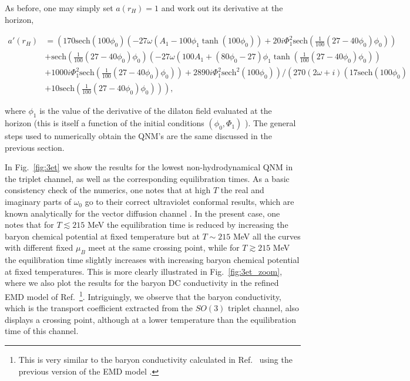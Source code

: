 \documentclass[aps,prd,showkeys,superscriptaddress,singlecolumn,nofootinbib,floatfix]{revtex4-1}
\begin{document}
As before, one may simply set $a(r_H)=1$ and work out its derivative at the horizon,
\begin{widetext}
\begin{align}
a'(r_H) &= \left( 170 \text{sech}\left(100 \phi _0\right) \left(-27 \omega  \left(A_1-100 \phi _1 \tanh \left(100 \phi _0\right)\right)+20 i \Phi _1^2 \text{sech}\left(\frac{1}{100}
   \left(27-40 \phi _0\right) \phi _0\right)\right)\right.\nonumber\\
&+\text{sech}\left(\frac{1}{100} \left(27-40 \phi _0\right) \phi _0\right) \left(-27 \omega  \left(100 A_1+\left(80 \phi
   _0-27\right) \phi _1 \tanh \left(\frac{1}{100} \left(27-40 \phi _0\right) \phi _0\right)\right)\right.\nonumber\\
&\left.\left. +1000 i \Phi _1^2 \text{sech}\left(\frac{1}{100} \left(27-40 \phi _0\right) \phi
   _0\right)\right)+2890 i \Phi _1^2 \text{sech}^2\left(100 \phi _0\right)\right) / \left(270 (2 \omega +i) \left(17 \text{sech}\left(100 \phi _0\right)\right.\right.\nonumber\\
&\left.\left.+10 \text{sech}\left(\frac{1}{100}
   \left(27-40 \phi _0\right) \phi _0\right)\right)\right),
\label{eq:a1num}
\end{align}
\end{widetext}
where $\phi_1$ is the value of the derivative of the dilaton field evaluated at the horizon (this is itself a function of the initial conditions $(\phi_0,\Phi_1)$ \cite{Critelli:2017oub}). The general steps used to numerically obtain the QNM's are the same discussed in the previous section.

In Fig.\ \ref{fig:3et} we show the results for the lowest non-hydrodynamical QNM in the triplet channel, as well as the corresponding equilibration times. As a basic consistency check of the numerics, one notes that at high $T$ the real and imaginary parts of $\omega_0$ go to their correct ultraviolet conformal results, which are known analytically for the vector diffusion channel \cite{Kovtun:2005ev}. In the present case, one notes that for $T\lesssim 215$ MeV the equilibration time is reduced by increasing the baryon chemical potential at fixed temperature but at $T\sim 215$ MeV all the curves with different fixed $\mu_B$ meet at the same crossing point, while for $T\gtrsim 215$ MeV the equilibration time slightly increases with increasing baryon chemical potential at fixed temperatures. This is more clearly illustrated in Fig.\ \ref{fig:3et_zoom}, where we also plot the results for the baryon DC conductivity in the refined EMD model of Ref.\ \cite{Critelli:2017oub}\footnote{This is very similar to the baryon conductivity calculated in Ref.\ \cite{Rougemont:2015ona} using the previous version of the EMD model \cite{Rougemont:2015wca}.}. Intriguingly, we observe that the baryon conductivity, which is the transport coefficient extracted from the $SO(3)$ triplet channel, also displays a crossing point, although at a lower temperature than the equilibration time of this channel.
\end{document}
